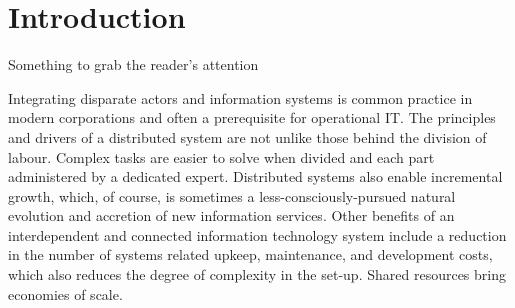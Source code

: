\documentclass[12pt,a4paper,oneside,pdftex]{report}
\begin{document}


\label{pages-prelude}
\cleardoublepage

\startfirstchapter

\pagestyle{headings}


% 
\chapter{Introduction}
\label{chapter:introduction}

Something to grab the reader's attention

Integrating disparate actors and information systems is common practice in modern corporations and often a prerequisite for operational IT. The principles and drivers of a distributed system are not unlike those behind the division of labour. Complex tasks are easier to solve when divided and each part administered by a dedicated expert. Distributed systems also enable incremental growth, which, of course, is sometimes a less-consciously-pursued natural evolution and accretion of new information services. Other benefits of an interdependent and connected information technology system include a reduction in the number of systems related upkeep, maintenance, and development costs, which also reduces the degree of complexity in the set-up. Shared resources bring economies of scale.
\end{document}
